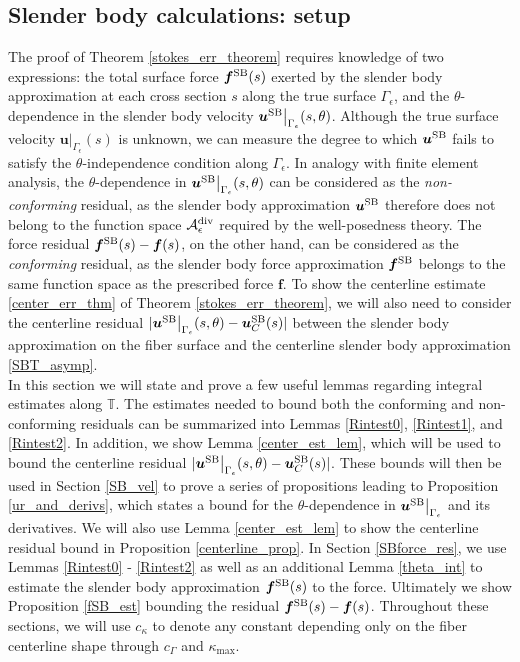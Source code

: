 \documentclass[11pt]{article}
\numberwithin{equation}{section}
\newcommand{\T}{\mathbb{T}}
\newcommand{\A}{\mathcal{A}}
\newcommand{\bu}{\bm{u}}
\newcommand{\dive}{{\rm{div}}}
\newcommand{\SB}{{\rm SB}}
\theoremstyle{definition}
\begin{document}
\subsection{Slender body calculations: setup}
The proof of Theorem \ref{stokes_err_theorem} requires knowledge of two expressions: the total surface force ${\bm f}^{\SB}(s)$ exerted by the slender body approximation at each cross section $s$ along the true surface $\Gamma_{\epsilon}$, and the $\theta$-dependence in the slender body velocity $\bu^{\SB}\big|_{\Gamma_\epsilon}(s,\theta)$. Although the true surface velocity $\bu\big|_{\Gamma_{\epsilon}}(s)$ is unknown, we can measure the degree to which $\bu^{\SB}$ fails to satisfy the $\theta$-independence condition along $\Gamma_\epsilon$. In analogy with finite element analysis, the $\theta$-dependence in $\bu^{\SB}\big|_{\Gamma_{\epsilon}}(s,\theta)$ can be considered as the {\it non-conforming} residual, as the slender body approximation $\bu^{\SB}$ therefore does not belong to the function space $\A_{\epsilon}^{\dive}$ required by the well-posedness theory. The force residual ${\bm f}^{\SB}(s)-{\bm f}(s)$, on the other hand, can be considered as the {\it conforming} residual, as the slender body force approximation ${\bm f}^{\SB}$ belongs to the same function space as the prescribed force ${\bm f}$. To show the centerline estimate \eqref{center_err_thm} of Theorem \ref{stokes_err_theorem}, we will also need to consider the centerline residual $|\bu^{\SB}\big|_{\Gamma_\epsilon}(s,\theta)-\bu^{\SB}_C(s)|$ between the slender body approximation on the fiber surface and the centerline slender body approximation \eqref{SBT_asymp}. \\

In this section we will state and prove a few useful lemmas regarding integral estimates along $\T$. The estimates needed to bound both the conforming and non-conforming residuals can be summarized into Lemmas \ref{Rintest0}, \ref{Rintest1}, and \ref{Rintest2}. In addition, we show Lemma \ref{center_est_lem}, which will be used to bound the centerline residual $|\bu^{\SB}\big|_{\Gamma_\epsilon}(s,\theta)-\bu^{\SB}_C(s)|$. These bounds will then be used in Section \ref{SB_vel} to prove a series of propositions leading to Proposition \ref{ur_and_derivs}, which states a bound for the $\theta$-dependence in $\bu^{\SB}\big|_{\Gamma_\epsilon}$ and its derivatives. We will also use Lemma \ref{center_est_lem} to show the centerline residual bound in Proposition \ref{centerline_prop}. In Section \ref{SBforce_res}, we use Lemmas \ref{Rintest0} - \ref{Rintest2} as well as an additional Lemma \ref{theta_int} to estimate the slender body approximation $\bm{f}^{\SB}(s)$ to the force. Ultimately we show Proposition \ref{fSB_est} bounding the residual $\bm{f}^{\SB}(s) - \bm{f}(s)$. Throughout these sections, we will use $c_\kappa$ to denote any constant depending only on the fiber centerline shape through $c_\Gamma$ and $\kappa_{\max}$. \\
\end{document}
